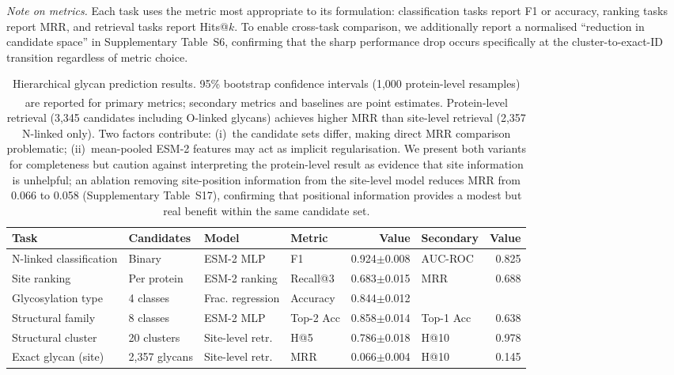 \documentclass[11pt,a4paper]{article}
\begin{document}
\textit{Note on metrics.} Each task uses the metric most appropriate to its
formulation: classification tasks report F1 or accuracy, ranking tasks report
MRR, and retrieval tasks report Hits@$k$. To enable cross-task comparison, we
additionally report a normalised ``reduction in candidate space'' in
Supplementary Table~S6, confirming that the sharp performance drop occurs
specifically at the cluster-to-exact-ID transition regardless of metric choice.

\begin{table}[ht]
\centering
\caption{Hierarchical glycan prediction results. 95\% bootstrap confidence
intervals (1,000 protein-level resamples) are reported for primary metrics;
secondary metrics and baselines are point estimates.
\textsuperscript{\dag}Protein-level retrieval (3,345 candidates including O-linked glycans) achieves higher MRR than site-level retrieval (2,357 N-linked only). Two factors contribute: (i)~the candidate sets differ, making direct MRR comparison problematic; (ii)~mean-pooled ESM-2 features may act as implicit regularisation. We present both variants for completeness but caution against interpreting the protein-level result as evidence that site information is unhelpful; an ablation removing site-position information from the site-level model reduces MRR from 0.066 to 0.058 (Supplementary Table~S17), confirming that positional information provides a modest but real benefit within the same candidate set.}
\label{tab:hierarchical}
\small
\begin{tabular}{llllrlr}
\toprule
\textbf{Task} & \textbf{Candidates} & \textbf{Model} & \textbf{Metric} & \textbf{Value} & \textbf{Secondary} & \textbf{Value} \\
\midrule
N-linked classification & Binary & ESM-2 MLP & F1 & 0.924{\scriptsize$\pm$0.008} & AUC-ROC & 0.825 \\
Site ranking & Per protein & ESM-2 ranking & Recall@3 & 0.683{\scriptsize$\pm$0.015} & MRR & 0.688 \\
Glycosylation type & 4 classes & Frac. regression & Accuracy & 0.844{\scriptsize$\pm$0.012} & & \\
Structural family & 8 classes & ESM-2 MLP & Top-2 Acc & 0.858{\scriptsize$\pm$0.014} & Top-1 Acc & 0.638 \\
Structural cluster & 20 clusters & Site-level retr. & H@5 & 0.786{\scriptsize$\pm$0.018} & H@10 & 0.978 \\
Exact glycan (site) & 2,357 glycans & Site-level retr. & MRR & 0.066{\scriptsize$\pm$0.004} & H@10 & 0.145 \\

\end{tabular}
\end{table}
\end{document}
